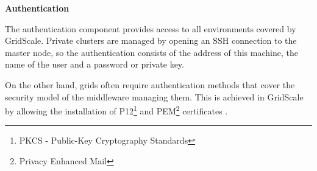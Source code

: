 \vspace{3mm}
\textbf{Authentication}
\vspace{1mm}

The authentication component provides access to all environments covered by GridScale. Private clusters are managed by opening an SSH connection to the master node, so the authentication consists of the address of this machine, the name of the user and a password or private key.

On the other hand, grids often require authentication methods that cover the security model of the middleware managing them. This is achieved in GridScale by allowing the installation of P12\footnote{PKCS - Public-Key Cryptography Standards} and PEM\footnote{Privacy Enhanced Mail} certificates \cite{Reuillon2016}.